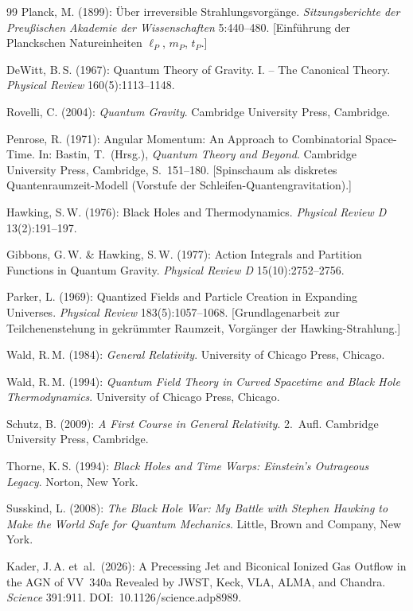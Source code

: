 ﻿\documentclass[12pt,a4paper]{report}
\begin{document}
\begin{thebibliography}{99}
Planck, M. (1899): Über irreversible Strahlungsvorgänge. \textit{Sitzungsberichte der Preußischen Akademie der Wissenschaften} 5:440--480. [Einführung der Planckschen Natureinheiten $\ell_P$, $m_P$, $t_P$.]

DeWitt, B.\,S. (1967): Quantum Theory of Gravity. I. -- The Canonical Theory. \textit{Physical Review} 160(5):1113--1148.

Rovelli, C. (2004): \textit{Quantum Gravity}. Cambridge University Press, Cambridge.

Penrose, R. (1971): Angular Momentum: An Approach to Combinatorial Space-Time. In: Bastin, T.\ (Hrsg.), \textit{Quantum Theory and Beyond}. Cambridge University Press, Cambridge, S.\ 151--180. [Spinschaum als diskretes Quantenraumzeit-Modell (Vorstufe der Schleifen-Quantengravitation).]

Hawking, S.\,W. (1976): Black Holes and Thermodynamics. \textit{Physical Review D} 13(2):191--197.

Gibbons, G.\,W. \& Hawking, S.\,W. (1977): Action Integrals and Partition Functions in Quantum Gravity. \textit{Physical Review D} 15(10):2752--2756.

Parker, L. (1969): Quantized Fields and Particle Creation in Expanding Universes. \textit{Physical Review} 183(5):1057--1068. [Grundlagenarbeit zur Teilchenenstehung in gekrümmter Raumzeit, Vorgänger der Hawking-Strahlung.]

Wald, R.\,M. (1984): \textit{General Relativity}. University of Chicago Press, Chicago.

Wald, R.\,M. (1994): \textit{Quantum Field Theory in Curved Spacetime and Black Hole Thermodynamics}. University of Chicago Press, Chicago.

Schutz, B. (2009): \textit{A First Course in General Relativity}. 2.\ Aufl. Cambridge University Press, Cambridge.

Thorne, K.\,S. (1994): \textit{Black Holes and Time Warps: Einstein's Outrageous Legacy}. Norton, New York.

Susskind, L. (2008): \textit{The Black Hole War: My Battle with Stephen Hawking to Make the World Safe for Quantum Mechanics}. Little, Brown and Company, New York.


Kader, J.\,A. et~al.\ (2026): A Precessing Jet and Biconical Ionized Gas Outflow in the AGN of VV~340a Revealed by JWST, Keck, VLA, ALMA, and Chandra. \textit{Science} 391:911. DOI:~10.1126/science.adp8989.

\end{thebibliography}
	
\end{document}
